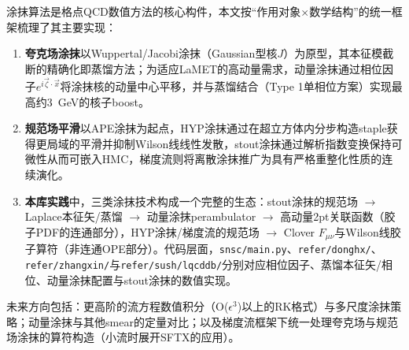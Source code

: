 \documentclass[12pt,a4paper]{ctexart}
\theoremstyle{definition}
\begin{document}
涂抹算法是格点QCD数值方法的核心构件，本文按``作用对象$\times$数学结构''的统一框架梳理了其主要实现：

\begin{enumerate}
    \item \textbf{夸克场涂抹}以Wuppertal/Jacobi涂抹（Gaussian型核$J$）为原型，其本征模截断的精确化即蒸馏方法；为适应LaMET的高动量需求，动量涂抹通过相位因子$e^{i\vec{\zeta}\cdot\vec{x}}$将涂抹核的动量中心平移，并与蒸馏结合（Type 1单相位方案）实现最高约3~GeV的核子boost\cite{Bali2016,Egerer2021a}。

    \item \textbf{规范场平滑}以APE涂抹为起点，HYP涂抹通过在超立方体内分步构造staple获得更局域的平滑并抑制Wilson线线性发散，stout涂抹通过解析指数变换保持可微性从而可嵌入HMC，梯度流则将离散涂抹推广为具有严格重整化性质的连续演化\cite{APE1987,HYP2001,Morningstar2004,LuscherWeisz2011}。

    \item \textbf{本库实践}中，三类涂抹技术构成一个完整的生态：stout涂抹的规范场 $\to$ Laplace本征矢/蒸馏 $\to$ 动量涂抹perambulator $\to$ 高动量2pt关联函数（胶子PDF的连通部分），HYP涂抹/梯度流的规范场 $\to$ Clover $F_{\mu\nu}$与Wilson线胶子算符（非连通OPE部分）\cite{Chen2025gluon,NoteGluonPDFs}。代码层面，\texttt{snsc/main.py}、\texttt{refer/donghx/}、\texttt{refer/zhangxin/}与\texttt{refer/sush/lqcddb/}分别对应相位因子、蒸馏本征矢/相位、动量涂抹配置与stout涂抹的数值实现。
\end{enumerate}

未来方向包括：更高阶的流方程数值积分（O($\epsilon^3$)以上的RK格式）与多尺度涂抹策略；动量涂抹与其他smear的定量对比；以及梯度流框架下统一处理夸克场与规范场涂抹的算符构造（小流时展开SFTX的应用）\cite{GradientFlowDoc}。

\end{document}
